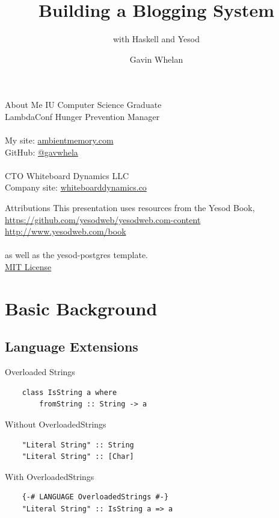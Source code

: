 \documentclass[pdf]{beamer}
\title{Building a Blogging System}
\subtitle{with Haskell and Yesod}
\author{Gavin Whelan}
\begin{document}
\begin{frame}
  \titlepage
\end{frame}

\begin{frame}{About Me}
  IU Computer Science Graduate\\
  LambdaConf Hunger Prevention Manager\\
  \\
  My site: \href{https://ambientmemory.com}{ambientmemory.com}\\
  GitHub: \href{https://github.com/gavwhela}{@gavwhela}\\
  \\
  CTO Whiteboard Dynamics LLC\\
  Company site: \href{https://whiteboarddynamics.co}{whiteboarddynamics.co}\\
\end{frame}

\begin{frame}{Attributions}
  This presentation uses resources from the Yesod Book,\\
  \url{https://github.com/yesodweb/yesodweb.com-content}\\
  \url{http://www.yesodweb.com/book}\\
  \\
  as well as the yesod-postgres template.\\
  \href{https://github.com/commercialhaskell/stack-templates/blob/master/LICENSE}{MIT License}\\
\end{frame}

\section{Basic Background}
\subsection{Language Extensions}
\begin{frame}[fragile]{Overloaded Strings}
  \begin{verbatim}
    class IsString a where
        fromString :: String -> a
  \end{verbatim}
  \pause
  \vspace{1em}
  Without OverloadedStrings
  \begin{verbatim}
    "Literal String" :: String
    "Literal String" :: [Char]
  \end{verbatim}
  \pause
  \vspace{1em}
  With OverloadedStrings
  \begin{verbatim}
    {-# LANGUAGE OverloadedStrings #-}
    "Literal String" :: IsString a => a
  \end{verbatim}
\end{frame}
\end{document}

